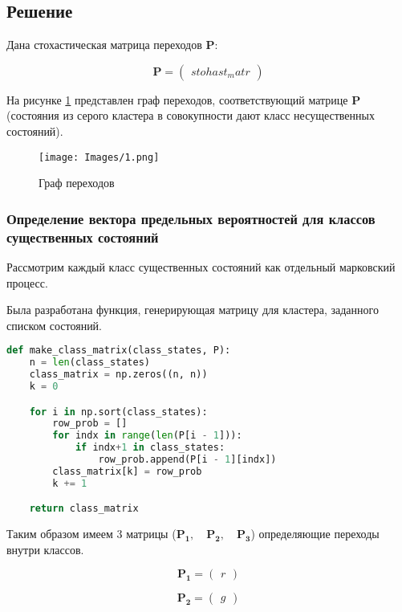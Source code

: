 \subsection{Решение}
Дана стохастическая матрица переходов $\mathbf{P}$:

$$\mathbf{P}=\begin{pmatrix}
{{ stohast_matr }}
\end{pmatrix}$$

На рисунке \ref{graph} представлен граф переходов, соответствующий матрице $\mathbf{P}$ (состояния из серого кластера в совокупности дают класс несущественных состояний).
\begin{figure}[H]
\centerline{\texttt{[image: Images/1.png]}}
\caption{Граф переходов}
\label{graph}
\end{figure}

\subsubsection{Определение вектора предельных вероятностей для классов существенных состояний}

Рассмотрим каждый класс существенных состояний как отдельный марковский процесс.

Была разработана функция, генерирующая матрицу для кластера, заданного списком состояний.

\begin{lstlisting}[language=python, label=prog,caption={\textit{Генерация стахастической матрицы переходов внутри кластера}}]
def make_class_matrix(class_states, P):
    n = len(class_states)
    class_matrix = np.zeros((n, n))
    k = 0

    for i in np.sort(class_states):
        row_prob = []
        for indx in range(len(P[i - 1])):
            if indx+1 in class_states:
                row_prob.append(P[i - 1][indx])
        class_matrix[k] = row_prob
        k += 1

    return class_matrix
\end{lstlisting}

Таким образом имеем 3 матрицы ($\mathbf{P_{1}}, \quad \mathbf{P_{2}}, \quad \mathbf{P_{3}}$) определяющие переходы внутри классов.

$$\mathbf{P_{1}}=
\begin{pmatrix}
    {{ r }}
\end{pmatrix}$$

$$\mathbf{P_{2}}=
\begin{pmatrix}
    {{ g }}
\end{pmatrix}$$

